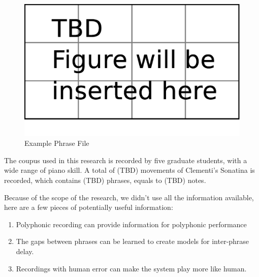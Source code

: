 \begin{figure}[tp]
   \begin{center}
      \includegraphics[width=\textwidth]{fig/TBDFigure}

   \end{center}
   \caption{Example Phrase File}
   \label{fig:phrase}
\end{figure}


The coupus used in this research is recorded by five graduate students, with a wide range of piano skill. A total of (TBD) movements of Clementi's Sonatina is recorded, which contains (TBD) phrases, equals to (TBD) notes. 

Because of the scope of the research, we didn't use all the information available, here are a few pieces of potentially useful information:
\begin{enumerate}
   \item Polyphonic recording can provide information for polyphonic performance
   \item The gaps between phrases can be learned to create models for inter-phrase delay.
   \item Recordings with human error can make the system play more like human.
\end{enumerate}

